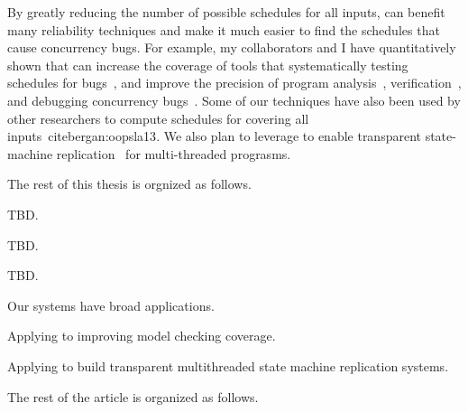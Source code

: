 By greatly reducing the number of possible schedules for all inputs, \smt can benefit many reliability 
techniques and make it much easier to find the schedules that cause concurrency 
bugs. For example, my collaborators and I have quantitatively shown that \smt can 
increase the coverage of tools that systematically testing schedules for 
bugs~\cite{parrot:sosp13, dbug:spin11, modist:nsdi09}, and improve the precision 
of program analysis~\cite{wu:pldi12}, verification~\cite{wu:pldi12}, and 
debugging concurrency bugs~\cite{cui:tern:osdi10}. Some of our \smt techniques have 
also been used by other researchers to compute schedules for covering all 
inputs~cite{bergan:oopsla13}. We also plan to leverage \smt to enable transparent 
state-machine replication~\cite{paxos} for multi-threaded prograsms.

The rest of this thesis is orgnized as follows. 


\tern TBD.

\peregrine TBD.

\parrot TBD.

Our \smt systems have broad applications.

Applying \smt to improving model checking coverage.

Applying \smt to build transparent multithreaded state machine replication systems.

The rest of the article is organized as follows.

